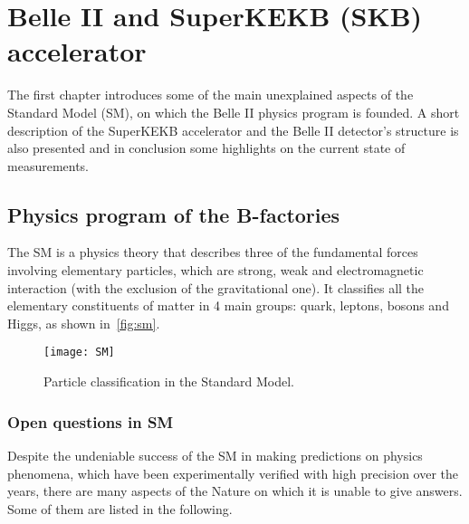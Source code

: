 
\chapter{Belle II and SuperKEKB (SKB) accelerator}

The first chapter introduces some of the main unexplained aspects of the Standard Model (SM), on which the Belle II physics program is founded. A short description of the SuperKEKB accelerator and the Belle II detector's structure is also presented and in conclusion some highlights on the current state of measurements.


\section{Physics program of the B-factories}

The SM is a physics theory that describes three of the fundamental forces involving elementary particles, which are strong, weak and electromagnetic interaction (with the exclusion of the gravitational one). It classifies all the elementary constituents of matter in 4 main groups: quark, leptons, bosons and Higgs, as shown in~\autoref{fig:sm}.


\begin{figure}[h]
\centering
\texttt{[image: SM]}
\caption{Particle classification in the Standard Model.}
\label{fig:sm}
\end{figure}




\subsection{Open questions in SM}


Despite the undeniable success of the SM in making predictions on physics phenomena, which have been experimentally verified with high precision over the years, there are many aspects of the Nature on which it is unable to give answers. Some of them are listed in the following.

